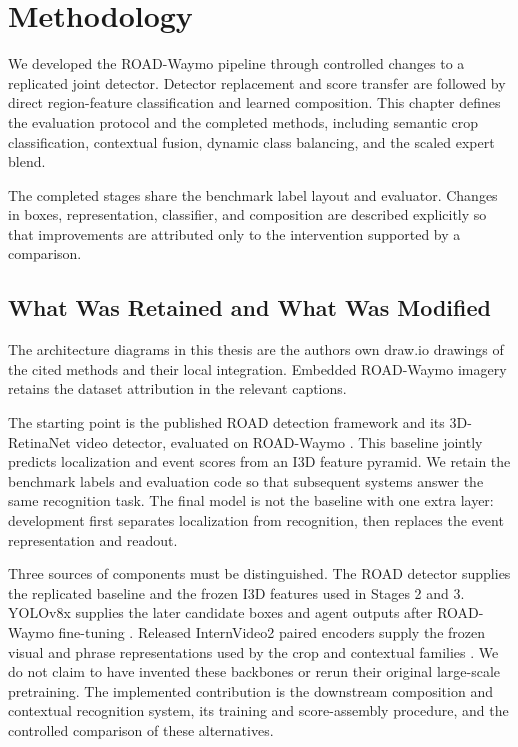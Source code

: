 \chapter{Methodology}

We developed the ROAD-Waymo pipeline through controlled changes to a replicated joint detector. Detector replacement and score transfer are followed by direct region-feature classification and learned composition. This chapter defines the evaluation protocol and the completed methods, including semantic crop classification, contextual fusion, dynamic class balancing, and the scaled expert blend.

The completed stages share the benchmark label layout and evaluator. Changes in boxes, representation, classifier, and composition are described explicitly so that improvements are attributed only to the intervention supported by a comparison.

\section{What Was Retained and What Was Modified}
\label{sec:baseline-modifications}

The architecture diagrams in this thesis are the author\textquotesingle s own draw.io drawings of the cited methods and their local integration. Embedded ROAD-Waymo imagery retains the dataset attribution in the relevant captions.

The starting point is the published ROAD detection framework and its 3D-RetinaNet video detector, evaluated on ROAD-Waymo \cite{road,road-waymo}. This baseline jointly predicts localization and event scores from an I3D feature pyramid. We retain the benchmark labels and evaluation code so that subsequent systems answer the same recognition task. The final model is not the baseline with one extra layer: development first separates localization from recognition, then replaces the event representation and readout.

Three sources of components must be distinguished. The ROAD detector supplies the replicated baseline and the frozen I3D features used in Stages 2 and 3. YOLOv8x supplies the later candidate boxes and agent outputs after ROAD-Waymo fine-tuning \cite{yolov8}. Released InternVideo2 paired encoders supply the frozen visual and phrase representations used by the crop and contextual families \cite{internvideo2,internvideo2-clip-s}. We do not claim to have invented these backbones or rerun their original large-scale pretraining. The implemented contribution is the downstream composition and contextual recognition system, its training and score-assembly procedure, and the controlled comparison of these alternatives.

